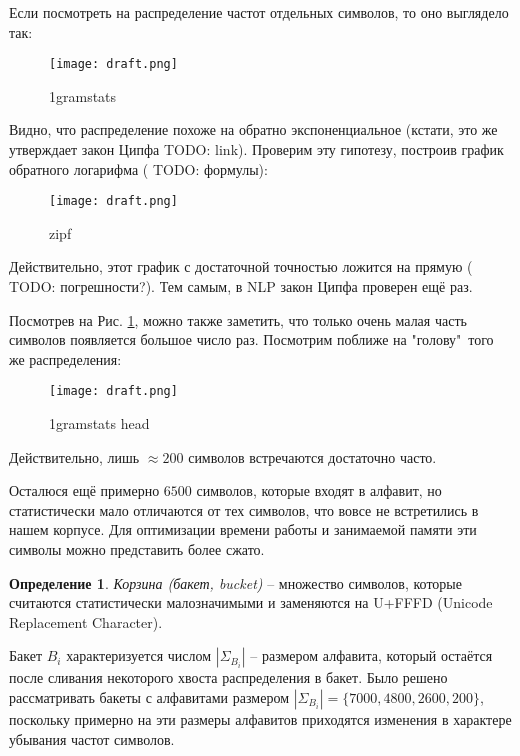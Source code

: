 \documentclass[14pt,russian]{extreport}
\theoremstyle{definition}
\newtheorem{definition}{Определение}[subsection]
\newcommand{\todo}[1]{}
\renewcommand{\todo}[1]{{\color{red} TODO: {#1}}}
\begin{document}
Если посмотреть на распределение частот отдельных символов, то оно выглядело так:

\begin{figure}[H]
	\centering
	\texttt{[image: draft.png]}
	\caption{1gramstats}
	\label{fig:1gramstats_all}
\end{figure}

Видно, что распределение похоже на обратно экспоненциальное (кстати, это же утверждает закон Ципфа \todo{link}). Проверим эту гипотезу, построив график обратного логарифма (\todo{формулы}):

\begin{figure}[H]
	\centering
	\texttt{[image: draft.png]}
	\caption{zipf}
	\label{fig:zipf1gram}
\end{figure}

Действительно, этот график с достаточной точностью ложится на прямую (\todo{погрешности?}). Тем самым, в NLP закон Ципфа проверен ещё раз.

Посмотрев на Рис. \ref{fig:1gramstats_all}, можно также заметить, что только очень малая часть символов появляется большое число раз. Посмотрим поближе на "голову"\ того же распределения:

\begin{figure}[H]
	\centering
	\texttt{[image: draft.png]}
	\caption{1gramstats head}
	\label{fig:gramstats_head}
\end{figure}

Действительно, лишь $\approx 200$ символов встречаются достаточно часто.

Осталюся ещё примерно $6500$ символов, которые входят в алфавит, но статистически мало отличаются от тех символов, что вовсе не встретились в нашем корпусе. Для оптимизации времени работы и занимаемой памяти эти символы можно представить более сжато.

\begin{definition}
	{\textit{Корзина (бакет, bucket)}} -- множество символов, которые считаются статистически малозначимыми и заменяются на U+FFFD (Unicode Replacement Character).
\end{definition}

Бакет $B_i$ характеризуется числом $|\Sigma_{B_i}|$ -- размером алфавита, который остаётся после сливания некоторого хвоста распределения в бакет. Было решено рассматривать бакеты с алфавитами размером $|\Sigma_{B_i}| = \{ 7000, 4800, 2600, 200 \}$, поскольку примерно на эти размеры алфавитов приходятся изменения в характере убывания частот символов.
\end{document}
